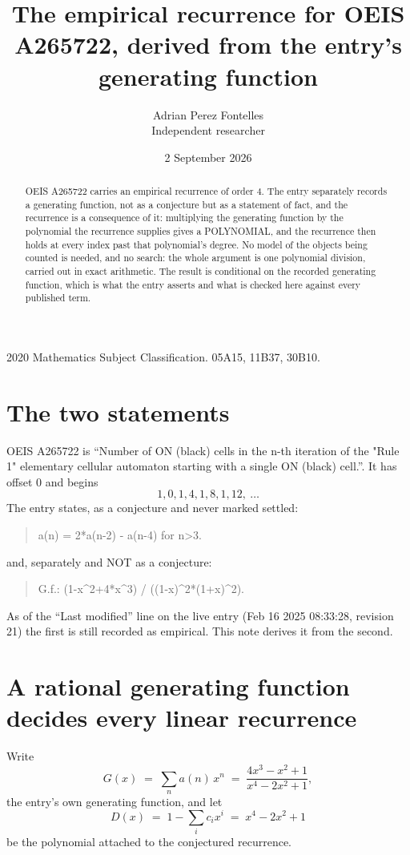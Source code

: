 \documentclass[11pt,a4paper]{article}
\title{The empirical recurrence for OEIS A265722, derived from the entry's generating function}
\author{Adrian Perez Fontelles\\ \small Independent researcher}
\date{2 September 2026}
\theoremstyle{plain}
\theoremstyle{definition}
\begin{document}
\maketitle

\begin{abstract}
OEIS A265722 carries an empirical recurrence of order $4$. The entry separately records a
generating function, not as a conjecture but as a statement of fact, and the recurrence is a
consequence of it: multiplying the generating function by the polynomial the recurrence
supplies gives a POLYNOMIAL, and the recurrence then holds at every index past that
polynomial's degree. No model of the objects being counted is needed, and no search: the
whole argument is one polynomial division, carried out in exact arithmetic. The result is
conditional on the recorded generating function, which is what the entry asserts and what is
checked here against every published term.
\end{abstract}

\noindent\small 2020 Mathematics Subject Classification. 05A15, 11B37, 30B10.\normalsize

\section{The two statements}

OEIS A265722 is ``Number of ON (black) cells in the n-th iteration of the "Rule 1" elementary cellular automaton starting with a single ON (black) cell.''. It has offset $0$ and begins
\[
1, 0, 1, 4, 1, 8, 1, 12,\ \dots
\]
The entry states, as a conjecture and never marked settled:
\begin{quote}
a(n) = 2*a(n-2) - a(n-4) for n>3.
\end{quote}
and, separately and NOT as a conjecture:
\begin{quote}
G.f.: (1-x\^{}2+4*x\^{}3) / ((1-x)\^{}2*(1+x)\^{}2).
\end{quote}
As of the ``Last modified'' line on the live entry (Feb 16 2025 08:33:28, revision 21) the first is still
recorded as empirical. This note derives it from the second.

\section{A rational generating function decides every linear recurrence}

Write
\[
G(x)\;=\;\sum_{n}a(n)\,x^{n}\;=\;\frac{4 x^{3} - x^{2} + 1}{x^{4} - 2 x^{2} + 1},
\]
the entry's own generating function, and let
\[
D(x)\;=\;1-\sum_i c_i x^{i}\;=\;x^{4} - 2 x^{2} + 1
\]
be the polynomial attached to the conjectured recurrence.
\end{document}
